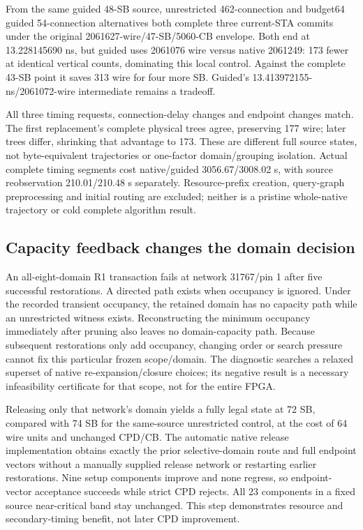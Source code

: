 \documentclass[conference,10pt]{IEEEtran}
\begin{document}
From the same guided 48-SB source, unrestricted 462-connection and budget64 guided 54-connection alternatives both complete three current-STA commits under the original 2061627-wire/47-SB/5060-CB envelope. Both end at 13.228145690 ns, but guided uses 2061076 wire versus native 2061249: 173 fewer at identical vertical counts, dominating this local control. Against the complete 43-SB point it saves 313 wire for four more SB. Guided's 13.413972155-ns/2061072-wire intermediate remains a tradeoff.

All three timing requests, connection-delay changes and endpoint changes match. The first replacement's complete physical trees agree, preserving 177 wire; later trees differ, shrinking that advantage to 173. These are different full source states, not byte-equivalent trajectories or one-factor domain/grouping isolation. Actual complete timing segments cost native/guided 3056.67/3008.02 s, with source reobservation 210.01/210.48 s separately. Resource-prefix creation, query-graph preprocessing and initial routing are excluded; neither is a pristine whole-native trajectory or cold complete algorithm result.

\subsection{Capacity feedback changes the domain decision}
An all-eight-domain R1 transaction fails at network 31767/pin 1 after five successful restorations. A directed path exists when occupancy is ignored. Under the recorded transient occupancy, the retained domain has no capacity path while an unrestricted witness exists. Reconstructing the minimum occupancy immediately after pruning also leaves no domain-capacity path. Because subsequent restorations only add occupancy, changing order or search pressure cannot fix this particular frozen scope/domain. The diagnostic searches a relaxed superset of native re-expansion/closure choices; its negative result is a necessary infeasibility certificate for that scope, not for the entire FPGA.

Releasing only that network's domain yields a fully legal state at 72 SB, compared with 74 SB for the same-source unrestricted control, at the cost of 64 wire units and unchanged CPD/CB. The automatic native release implementation obtains exactly the prior selective-domain route and full endpoint vectors without a manually supplied release network or restarting earlier restorations. Nine setup components improve and none regress, so endpoint-vector acceptance succeeds while strict CPD rejects. All 23 components in a fixed source near-critical band stay unchanged. This step demonstrates resource and secondary-timing benefit, not later CPD improvement.
\end{document}
